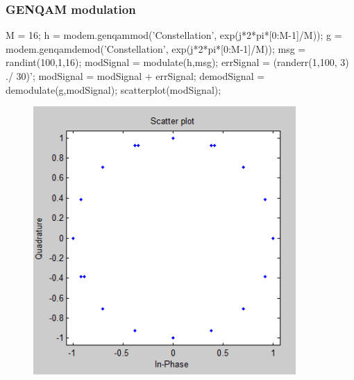 \documentclass[10pt,a4paper]{article}
\begin{document}
\subsubsection{GENQAM modulation}
M = 16; \newline
h = modem.genqammod('Constellation', exp(j*2*pi*[0:M-1]/M)); \newline
g = modem.genqamdemod('Constellation', exp(j*2*pi*[0:M-1]/M)); \newline
msg = randint(100,1,16);\newline 
modSignal = modulate(h,msg); \newline
errSignal = (randerr(1,100, 3) ./ 30)';\newline 
modSignal = modSignal + errSignal; \newline
demodSignal = demodulate(g,modSignal); \newline
scatterplot(modSignal);\newline
\begin{figure}[h]
\centering
\includegraphics[width=10cm]{1_4.png}  
\end{figure}
\newpage
\FloatBarrier
\end{document}

